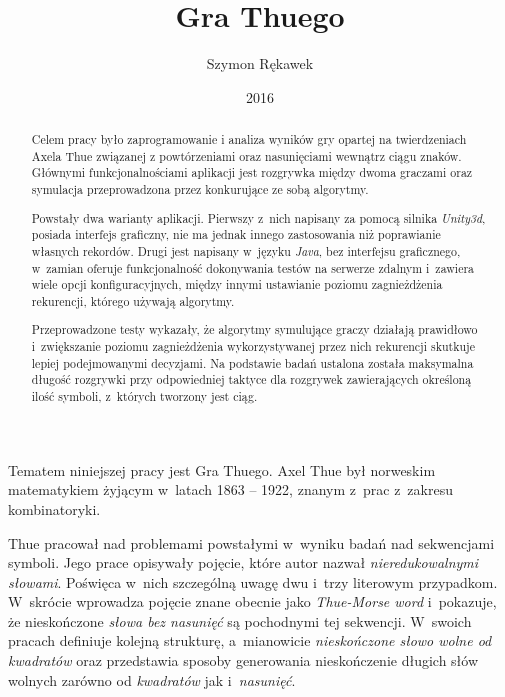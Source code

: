 \documentclass[document]{xmgr}
\author   {Szymon Rękawek}
\title    {Gra Thuego}
\date     {2016}
\begin{document}
\begin{abstract}


\nocite{rampersad2007overlap}

Celem pracy było zaprogramowanie i analiza wyników gry opartej na twierdzeniach Axela Thue związanej z powtórzeniami oraz nasunięciami wewnątrz ciągu znaków. Głównymi funkcjonalnościami aplikacji jest rozgrywka między dwoma graczami oraz symulacja przeprowadzona przez konkurujące ze sobą algorytmy. 

Powstały dwa warianty aplikacji. Pierwszy z~nich napisany za pomocą silnika \emph{Unity3d}, posiada interfejs graficzny, nie ma jednak innego zastosowania niż poprawianie własnych rekordów. Drugi jest napisany w~języku \emph{Java}, bez interfejsu graficznego, w~zamian oferuje funkcjonalność dokonywania testów na serwerze zdalnym i~zawiera wiele opcji konfiguracyjnych, między innymi ustawianie poziomu zagnieżdżenia rekurencji, którego używają algorytmy.

Przeprowadzone testy wykazały, że algorytmy symulujące graczy działają prawidłowo i~zwiększanie poziomu zagnieżdżenia wykorzystywanej przez nich rekurencji skutkuje lepiej podejmowanymi decyzjami. Na podstawie badań ustalona została maksymalna długość rozgrywki przy odpowiedniej taktyce dla rozgrywek zawierających określoną ilość symboli, z~których tworzony jest ciąg.
\end{abstract}


\maketitle

\introduction

Tematem niniejszej pracy jest Gra Thuego. Axel Thue był norweskim matematykiem żyjącym w~latach 1863 -- 1922, znanym z~prac z~zakresu kombinatoryki.

Thue pracował nad problemami powstałymi w~wyniku badań nad sekwencjami symboli. Jego prace \cite{repetition} opisywały pojęcie, które autor nazwał \emph{nieredukowalnymi słowami}. Poświęca w~nich szczególną uwagę dwu i~trzy literowym przypadkom. W~skrócie wprowadza pojęcie znane obecnie jako \emph{Thue-Morse word} i~pokazuje, że nieskończone \emph{słowa bez nasunięć} są pochodnymi tej sekwencji. W~swoich pracach definiuje kolejną strukturę, a~mianowicie \emph{nieskończone słowo wolne od kwadratów} oraz przedstawia sposoby generowania nieskończenie długich słów wolnych zarówno od \emph{kwadratów} jak i~\emph{nasunięć}.
\end{document}
